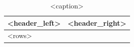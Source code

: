 
\begin{table}[H]
\centering
\caption{<caption>}
\label{tab:<label>}
\renewcommand{\arraystretch}{1.4}
\begin{tabular}{>{\raggedright\arraybackslash}p{} >{\raggedright\arraybackslash}p{}}
\toprule
\textbf{<header_left>} & \textbf{<header_right>} \\
\midrule
<rows>
\bottomrule
\end{tabular}
\end{table}